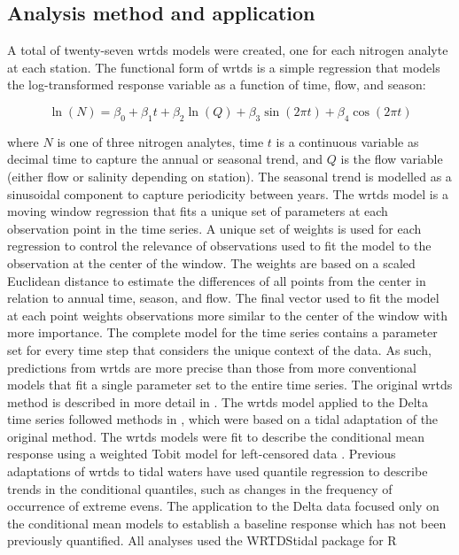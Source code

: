 \documentclass[letterpaper,12pt,oneside]{article}\usepackage[]{graphicx}\usepackage[]{color}
\begin{document}
\subsection{Analysis method and application}

A total of twenty-seven \ac{wrtds} models were created, one for each nitrogen analyte at each station.  The functional form of \ac{wrtds} is a simple regression that models the log-transformed response variable as a function of time, flow, and season:

\begin{equation}
\ln\left(N\right) = \beta_0 + \beta_1 t + \beta_2 \ln\left(Q\right) + \beta_3 \sin\left(2\pi t\right) + \beta_4 \cos\left(2\pi t\right)
\end{equation}  

\noindent where $N$ is one of three nitrogen analytes, time $t$ is a continuous variable as decimal time to capture the annual or seasonal trend, and $Q$ is the flow variable (either flow or salinity depending on station).  The seasonal trend is modelled as a sinusoidal component to capture periodicity between years.  The \ac{wrtds} model is a moving window regression that fits a unique set of parameters at each observation point in the time series.  A unique set of weights is used for each regression to control the relevance of observations used to fit the model to the observation at the center of the window. The weights are based on a scaled Euclidean distance to estimate the differences of all points from the center in relation to annual time, season, and flow.  The final vector used to fit the model at each point weights observations more similar to the center of the window with more importance.  The complete model for the time series contains a parameter set for every time step that considers the unique context of the data.  As such, predictions from \ac{wrtds} are more precise than those from more conventional models that fit a single parameter set to the entire time series.  The original \ac{wrtds} method is described in more detail in \citep{Hirsch10}.  The \ac{wrtds} model applied to the Delta time series followed methods in \citet{Beck15}, which were based on a tidal adaptation of the original method.  The \ac{wrtds} models were fit to describe the conditional mean response using a weighted Tobit model for left-censored data \citep{Tobin58}.  Previous adaptations of \ac{wrtds} to tidal waters have used quantile regression to describe trends in the conditional quantiles, such as changes in the frequency of occurrence of extreme evens.  The application to the Delta data focused only on the conditional mean models to establish a baseline response which has not been previously quantified.  All analyses used the WRTDStidal package for R \citep{Beck16b,RDCT16}
\end{document}
